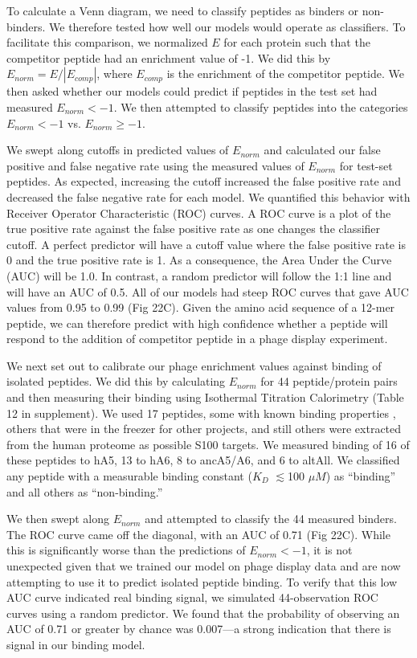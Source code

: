 To calculate a Venn diagram, we need to classify peptides as binders
or non-binders. We therefore tested how well our models would operate
as classifiers. To facilitate this comparison, we normalized $E$
for each protein such that the competitor peptide had an enrichment
value of -1. We did this by $E_{norm}=E/|E_{comp}|$, where $E_{comp}$
is the enrichment of the competitor peptide. We then asked whether
our models could predict if peptides in the test set had measured
$E_{norm}<-1$. We then attempted to classify peptides into the categories
$E_{norm}<-1$ vs. $E_{norm}\ge-1$. 

We swept along cutoffs in predicted values of $E_{norm}$ and calculated
our false positive and false negative rate using the measured values
of $E_{norm}$ for test-set peptides. As expected, increasing the
cutoff increased the false positive rate and decreased the false negative
rate for each model. We quantified this behavior with Receiver Operator
Characteristic (ROC) curves. A ROC curve is a plot of the true positive
rate against the false positive rate as one changes the classifier
cutoff. A perfect predictor will have a cutoff value where the false
positive rate is 0 and the true positive rate is 1. As a consequence,
the Area Under the Curve (AUC) will be 1.0. In contrast, a random
predictor will follow the 1:1 line and will have an AUC of 0.5. All
of our models had steep ROC curves that gave AUC values from 0.95
to 0.99 (Fig 22C). Given the amino acid sequence of a 12-mer peptide,
we can therefore predict with high confidence whether a peptide will
respond to the addition of competitor peptide in a phage display experiment. 

We next set out to calibrate our phage enrichment values against binding
of isolated peptides. We did this by calculating $E_{norm}$ for 44
peptide/protein pairs and then measuring their binding using Isothermal
Titration Calorimetry (Table 12 in supplement). We used 17 peptides, some with known
binding properties \citep{lee_structure_2008,streicher_annexin_2009,liriano_structure_2012},
others that were in the freezer for other projects, and still others
were extracted from the human proteome as possible S100 targets. We
measured binding of 16 of these peptides to hA5, 13 to hA6, 8 to ancA5/A6,
and 6 to altAll. We classified any peptide with a measurable binding
constant ($K_{D}$ $\apprle$100 $\mu M$) as ``binding'' and all others
as ``non-binding.'' 

We then swept along $E_{norm}$ and attempted to classify the 44 measured
binders. The ROC curve came off the diagonal, with an AUC of 0.71
(Fig 22C). While this is significantly worse than the predictions of
$E_{norm}<-1$, it is not unexpected given that we trained our model
on phage display data and are now attempting to use it to predict
isolated peptide binding. To verify that this low AUC curve indicated
real binding signal, we simulated 44-observation ROC curves using
a random predictor. We found that the probability of observing an
AUC of 0.71 or greater by chance was 0.007---a strong indication that
there is signal in our binding model. 

